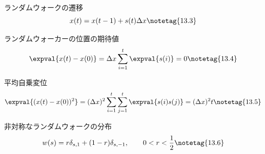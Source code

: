 \documentclass[uplatex,dvipdfmx,a4paper,11pt]{jsarticle}
\begin{document}
\begin{kirokuichiran}
\end{kirokuichiran}

\youtenseiri
\begin{noteshikilist}
  \item ランダムウォークの遷移 %
    \[ x(t)=x(t-1)+s(t)\Delta x \notetag{13.3} \]
  \item ランダムウォーカーの位置の期待値 %
    \[ \expval{x(t)-x(0)}=\Delta x\sum_{i=1}^{t}\expval{s(i)}=0 \notetag{13.4} \]
  \item 平均自乗変位 %
    \[ \expval{(x(t)-x(0))^{2}}=(\Delta x)^{2}\sum_{i=1}^{t}\sum_{j=1}^{t}\expval{s(i)s(j)}=(\Delta x)^{2}t \notetag{13.5} \]
  \item 非対称なランダムウォークの分布 %
    \[ w(s)=r\delta_{s,1}+(1-r)\delta_{s,-1},\qquad0<r<\frac{1}{2} \notetag{13.6} \]
\end{noteshikilist}
\end{document}
